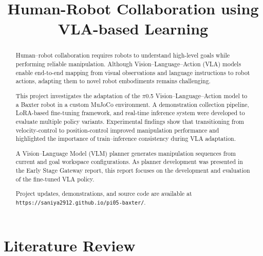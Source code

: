 \documentclass[conference, 12pt]{IEEEtran}
\begin{document}
\newcommand{\reporttitle}{Human-Robot Collaboration  through VLA-based Learning}
\newcommand{\reportauthor}{Saniya Patwardhan}
\newcommand{\reporttype}{MRes Late Stage Gateway Report}
\newcommand{\cid}{06059013}





\title{Human-Robot Collaboration using VLA-based Learning}

\author{
}

\maketitle


\begin{abstract}
Human--robot collaboration requires robots to understand high-level goals while performing reliable manipulation. Although Vision--Language--Action (VLA) models enable end-to-end mapping from visual observations and language instructions to robot actions, adapting them to novel robot embodiments remains challenging.

This project investigates the adaptation of the $\pi$0.5 Vision--Language--Action model to a Baxter robot in a custom MuJoCo environment. A demonstration collection pipeline, LoRA-based fine-tuning framework, and real-time inference system were developed to evaluate multiple policy variants. Experimental findings show that transitioning from velocity-control to position-control improved manipulation performance and highlighted the importance of train--inference consistency during VLA adaptation.

A Vision--Language Model (VLM) planner generates manipulation sequences from current and goal workspace configurations. As planner development was presented in the Early Stage Gateway report, this report focuses on the development and evaluation of the fine-tuned VLA policy.

Project updates, demonstrations, and source code are available at \texttt{https://saniya2912.github.io/pi05-baxter/}.
\end{abstract}


\section{Literature Review}
\end{document}
